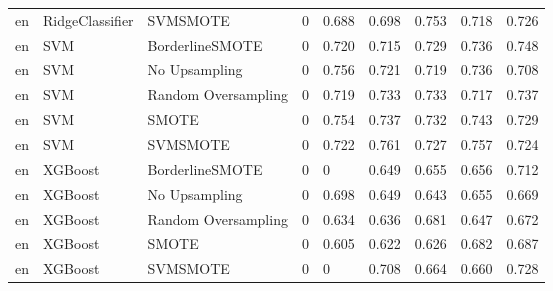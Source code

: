 \begin{tabular}{lllllllll}
      en &              RidgeClassifier &            SVMSMOTE &     0 &                     0.688 &                 0.698 &                  0.753 &                                   0.718 &     0.726 \\
      en &                          SVM &     BorderlineSMOTE &     0 &                     0.720 &                 0.715 &                  0.729 &                                   0.736 &     0.748 \\
      en &                          SVM &       No Upsampling &     0 &                     0.756 &                 0.721 &                  0.719 &                                   0.736 &     0.708 \\
      en &                          SVM & Random Oversampling &     0 &                     0.719 &                 0.733 &                  0.733 &                                   0.717 &     0.737 \\
      en &                          SVM &               SMOTE &     0 &                     0.754 &                 0.737 &                  0.732 &                                   0.743 &     0.729 \\
      en &                          SVM &            SVMSMOTE &     0 &                     0.722 &                 0.761 &                  0.727 &                                   0.757 &     0.724 \\
      en &                      XGBoost &     BorderlineSMOTE &     0 &                         0 &                 0.649 &                  0.655 &                                   0.656 &     0.712 \\
      en &                      XGBoost &       No Upsampling &     0 &                     0.698 &                 0.649 &                  0.643 &                                   0.655 &     0.669 \\
      en &                      XGBoost & Random Oversampling &     0 &                     0.634 &                 0.636 &                  0.681 &                                   0.647 &     0.672 \\
      en &                      XGBoost &               SMOTE &     0 &                     0.605 &                 0.622 &                  0.626 &                                   0.682 &     0.687 \\
      en &                      XGBoost &            SVMSMOTE &     0 &                         0 &                 0.708 &                  0.664 &                                   0.660 &     0.728 \\

\end{tabular}
